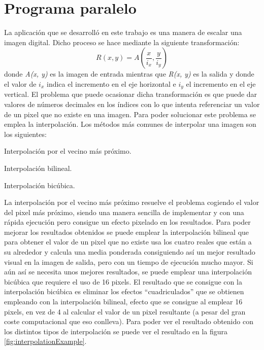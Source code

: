 \documentclass{article}
\begin{document}
\section{Programa paralelo}\label{sec:ParallelProgram}
{\setlength{\parskip}{0mm}
	La aplicación que se desarrolló en este trabajo es una manera de escalar una imagen digital. Dicho proceso se hace mediante la siguiente transformación:
\begin{equation}
R(x, y) = A \left( \frac{x}{i_x}, \frac{y}{i_y} \right)
\end{equation}
donde \emph{A(x, y)} es la imagen de entrada mientras que \emph{R(x, y)} es la salida y donde el valor de $i_x$ indica el incremento en el eje horizontal 
e $i_y$ el incremento en el eje vertical. El problema que puede ocasionar dicha transformación es que puede dar valores de números decimales en 
los índices con lo que intenta referenciar un valor de un pixel que no existe en una imagen. Para poder solucionar este problema se emplea la interpolación. 
Los métodos más comunes de interpolar una imagen son los siguientes\cite{WOODS}:
\begin{enumerate} {\setlength{\parskip}{0mm}
	\item Interpolación por el vecino más próximo.
	\item Interpolación bilineal.
	\item Interpolación bicúbica.
} \end{enumerate}
}

	La interpolación por el vecino más próximo resuelve el problema cogiendo el valor del pixel más próximo, siendo una manera sencilla de implementar y con una rápida ejecución pero consigue un efecto pixelado en los resultados. Para poder mejorar los resultados obtenidos se puede emplear la interpolación bilineal que para obtener el valor de un pixel que no existe usa los cuatro reales que están a su alrededor y calcula una media ponderada consiguiendo así un mejor resultado visual en la imagen de salida, pero con un tiempo de ejecución mucho mayor. Si aún así se necesita unos mejores resultados, se puede emplear una interpolación bicúbica que requiere el uso de 16 pixels. El resultado que se consigue con la interpolación bicúbica es eliminar los efectos ``cuadriculados'' que se obtienen empleando con la interpolación bilineal, efecto que se consigue al emplear 16 pixels, en vez de 4 al calcular el valor de un pixel resultante (a pesar del gran coste computacional que eso conlleva). Para poder ver el resultado obtenido con los distintos tipos de interpolación se puede ver el resultado en la figura \ref{fig:interpolationExample}.
\end{document}
